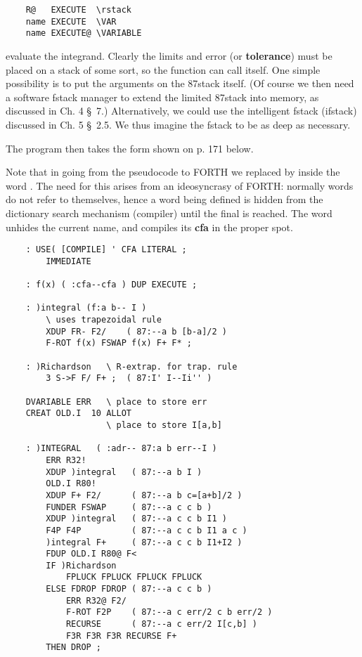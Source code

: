 \begin{lstlisting}
    R@   EXECUTE  \rstack
    name EXECUTE  \VAR
    name EXECUTE@ \VARIABLE
\end{lstlisting}

evaluate the integrand. Clearly the limits and error (or \textbf{tolerance}) must be placed on a stack of some sort, so the function can call itself. One simple possibility is to put the arguments on the 87stack itself. (Of course we then need a software fstack manager to extend the limited 87stack into memory, as discussed in Ch. 4 \S\ 7.) Alternatively, we could use the intelligent fstack (ifstack) discussed in Ch. 5 \S\ 2.5. We thus imagine the fstack to be as deep as necessary.

The program then takes the form shown on p. 171 below.

Note that in going from the pseudocode to FORTH we replaced  by  inside the word . The need for this arises from an ideosyncrasy of FORTH: normally words do not refer to themselves, hence a word being defined is hidden from the dictionary search mechanism (compiler) until the final \bc{;} is reached. The word  unhides the current name, and compiles its \textbf{cfa} in the proper spot.

\begin{lstlisting}
    : USE( [COMPILE] ' CFA LITERAL ;
        IMMEDIATE
    
    : f(x) ( :cfa--cfa ) DUP EXECUTE ;
    
    : )integral (f:a b-- I )
        \ uses trapezoidal rule
        XDUP FR- F2/    ( 87:--a b [b-a]/2 )
        F-ROT f(x) FSWAP f(x) F+ F* ;
    
    : )Richardson   \ R-extrap. for trap. rule
        3 S->F F/ F+ ;  ( 87:I' I--Ii'' )

    DVARIABLE ERR   \ place to store err
    CREAT OLD.I  10 ALLOT
                    \ place to store I[a,b]

    : )INTEGRAL   ( :adr-- 87:a b err--I )
        ERR R32!
        XDUP )integral   ( 87:--a b I )
        OLD.I R80!
        XDUP F+ F2/      ( 87:--a b c=[a+b]/2 )
        FUNDER FSWAP     ( 87:--a c c b )
        XDUP )integral   ( 87:--a c c b I1 )
        F4P F4P          ( 87:--a c c b I1 a c )
        )integral F+     ( 87:--a c c b I1+I2 )
        FDUP OLD.I R80@ F<
        IF )Richardson
            FPLUCK FPLUCK FPLUCK FPLUCK
        ELSE FDROP FDROP ( 87:--a c c b )
            ERR R32@ F2/
            F-ROT F2P    ( 87:--a c err/2 c b err/2 )
            RECURSE      ( 87:--a c err/2 I[c,b] )
            F3R F3R F3R RECURSE F+
        THEN DROP ;
\end{lstlisting}

